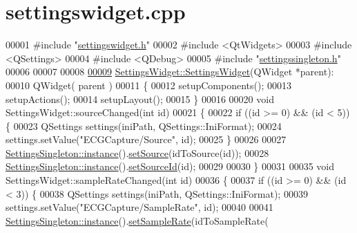 \hypertarget{settingswidget_8cpp_source}{}\section{settingswidget.\+cpp}
\label{settingswidget_8cpp_source}

\begin{DoxyCode}
00001 \textcolor{preprocessor}{#include "\hyperlink{settingswidget_8h}{settingswidget.h}"}
00002 \textcolor{preprocessor}{#include <QtWidgets>}
00003 \textcolor{preprocessor}{#include <QSettings>}
00004 \textcolor{preprocessor}{#include <QDebug>}
00005 \textcolor{preprocessor}{#include "\hyperlink{settingssingleton_8h}{settingssingleton.h}"}
00006 
00007 
00008 
\hypertarget{settingswidget_8cpp_source.tex_l00009}{}\hyperlink{classSettingsWidget_a339891dcba7d2813bc5d894bff494a78}{00009} \hyperlink{classSettingsWidget_a339891dcba7d2813bc5d894bff494a78}{SettingsWidget::SettingsWidget}(QWidget *parent):
00010     QWidget( parent )
00011 \{
00012     setupComponents();
00013     setupActions();
00014     setupLayout();
00015 \}
00016 
00020 \textcolor{keywordtype}{void} SettingsWidget::sourceChanged(\textcolor{keywordtype}{int} \textcolor{keywordtype}{id})
00021 \{
00022     \textcolor{keywordflow}{if} ((\textcolor{keywordtype}{id} >= 0) && (\textcolor{keywordtype}{id} < 5)) \{
00023         QSettings settings(iniPath, QSettings::IniFormat);
00024         settings.setValue(\textcolor{stringliteral}{"ECGCapture/Source"}, \textcolor{keywordtype}{id});
00025     \}
00026 
00027     \hyperlink{classSettingsSingleton_aad528becd7ce5903c418a5b8b718074c}{SettingsSingleton::instance}().\hyperlink{classSettingsSingleton_af3d750e4f32db65df430d03a9b947b16}{setSource}(idToSource(\textcolor{keywordtype}{id}));
00028     \hyperlink{classSettingsSingleton_aad528becd7ce5903c418a5b8b718074c}{SettingsSingleton::instance}().\hyperlink{classSettingsSingleton_af4b9b4364b4146711000f425dd5f5aa9}{setSourceId}(\textcolor{keywordtype}{id});
00029 
00030 \}
00031 
00035 \textcolor{keywordtype}{void} SettingsWidget::sampleRateChanged(\textcolor{keywordtype}{int} \textcolor{keywordtype}{id})
00036 \{
00037     \textcolor{keywordflow}{if} ((\textcolor{keywordtype}{id} >= 0) && (\textcolor{keywordtype}{id} < 3)) \{
00038         QSettings settings(iniPath, QSettings::IniFormat);
00039         settings.setValue(\textcolor{stringliteral}{"ECGCapture/SampleRate"}, \textcolor{keywordtype}{id});
00040 
00041         \hyperlink{classSettingsSingleton_aad528becd7ce5903c418a5b8b718074c}{SettingsSingleton::instance}().\hyperlink{classSettingsSingleton_afb6c1555d8a9a93fab574345b7e28e28}{setSampleRate}(idToSampleRate(\textcolor{keywordtype}{
}
\end{DoxyCode}
